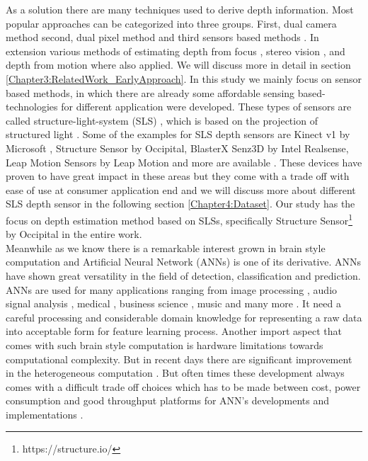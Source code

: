 As a solution there are many techniques used to derive depth information. Most popular approaches can be categorized into three groups. First, dual camera method \cite{li2009dual} second,  dual pixel method \cite{martinello2015dual, choi2017all} and  third sensors based methods \cite{salvi2004pattern}. In extension various methods of estimating depth from focus \cite{grossmann1987depth}, stereo vision \cite{bulthoff1988integration}, and depth from motion \cite{ullman1979interpretation} where also applied. We will discuss more in detail in section \ref{Chapter3:RelatedWork_EarlyApproach}. In this study we mainly focus on sensor based methods, in which there are already some affordable sensing based-technologies for different application were developed. These types of sensors are called structure-light-system (SLS) \cite{salvi2004pattern}, which is based on the projection of structured light \cite{zhang2012microsoft}. Some of the examples for SLS depth sensors are Kinect v1 by Microsoft , Structure Sensor by Occipital, BlasterX Senz3D by Intel Realsense, Leap Motion Sensors by Leap Motion \cite{marin2014hand} and more are available \cite{mal2018sparse}. These devices have proven to have great impact in these areas but they come with a trade off with ease of use at consumer application end and we will discuss more about different SLS depth sensor in the following section \ref{Chapter4:Dataset}. Our study has the focus on depth estimation method based on SLSs, specifically Structure Sensor\footnote{https://structure.io/} by Occipital in the entire work.\\

Meanwhile as we know there is a remarkable interest grown in brain style computation and Artificial Neural Network (ANNs) is one of its derivative. ANNs have shown great versatility in the field of detection, classification and prediction. ANNs are used for many applications ranging from image processing \cite{guyon1991applications} , audio signal analysis \cite{bourlard1993continuous}, medical \cite{baxt1990use}, business science \cite{widrow1994neural}, music \cite{nadar2019towards} and many more \cite{zhang2000neural}. It  need a careful processing and considerable domain knowledge for representing a raw data into acceptable form for feature learning process. Another import aspect that comes with such brain style computation is hardware limitations towards computational complexity. But in recent days there are significant improvement in the heterogeneous computation \cite{mittal2015survey}. But often times these development always comes with a difficult trade off choices which has to be made between cost, power consumption and good throughput platforms for ANN's developments and implementations \cite{mittal2019survey}. \\




